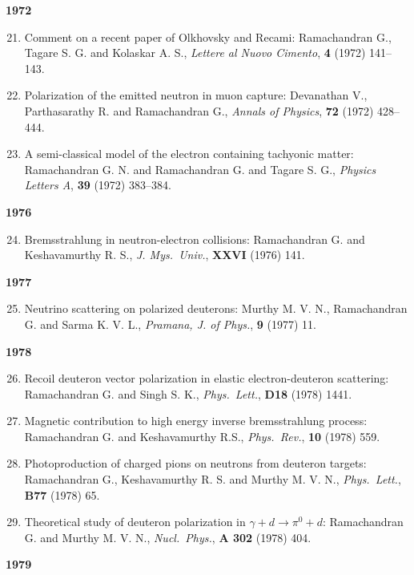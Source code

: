 \textbf{1972}
\begin{enumerate}
\setcounter{enumi}{20}
\item Comment on a recent paper of Olkhovsky and Recami: Ramachandran G., Tagare S. G. and Kolaskar A. S., \textit{Lettere al Nuovo Cimento}, {\bf 4} (1972) 141--143.
\item Polarization of the emitted neutron in muon capture: Devanathan V., Parthasarathy R. and Ramachandran G., \textit{Annals of Physics}, {\bf 72} (1972) 428--444.
\item A semi-classical model of the electron containing tachyonic matter: Ramachandran G. N. and Ramachandran G. and Tagare S. G., \textit{Physics Letters A}, {\bf 39} (1972) 383--384.
\end{enumerate}
\textbf{1976}
\begin{enumerate}
\setcounter{enumi}{23}
\item Bremsstrahlung in neutron-electron collisions: Ramachandran G. and Keshavamurthy R. S., \textit{J. Mys.\ Univ.}, {\bf XXVI} (1976) 141.
\end{enumerate}
\textbf{1977}
\begin{enumerate}
\setcounter{enumi}{24}
\item Neutrino scattering on polarized deuterons: Murthy M. V. N., Ramachandran G. and Sarma K. V. L., \textit{Pramana, J. of Phys.}, {\bf 9} (1977) 11.
\end{enumerate}
\textbf{1978}
\begin{enumerate}
\setcounter{enumi}{25}
\item Recoil deuteron vector polarization in elastic electron-deuteron scattering: Ramachandran G. and Singh S. K., \textit{Phys.\ Lett.}, {\bf D18} (1978) 1441.
\item Magnetic contribution to high energy inverse bremsstrahlung process: Ramachandran G. and Keshavamurthy R.S., \textit{Phys.\ Rev.}, {\bf 10} (1978) 559.
\item Photoproduction of charged pions on neutrons from deuteron targets: Ramachandran G., Keshavamurthy R. S. and Murthy M. V. N., \textit{Phys.\ Lett.}, {\bf B77} (1978) 65.
\item Theoretical study of deuteron polarization in $\gamma+d\to \pi^{0}+d$: Ramachandran G. and Murthy M. V. N., \textit{Nucl.\ Phys.}, {\bf A 302} (1978) 404.
\end{enumerate}
\textbf{1979}
